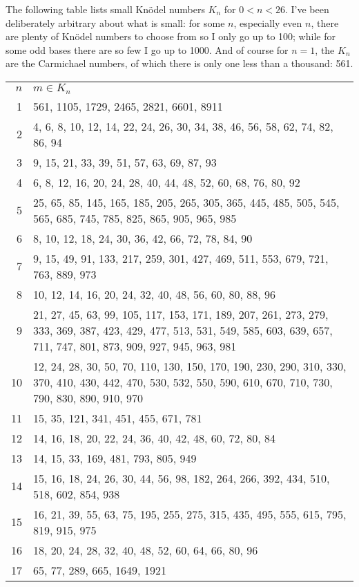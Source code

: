 \documentclass[12pt]{article}
\begin{document}
The following table lists small Kn\"odel numbers $K_n$ for $0 < n < 26$. I've been deliberately arbitrary about what is small: for some $n$, especially even $n$, there are plenty of Kn\"odel numbers to choose from so I only go up to 100; while for some odd bases there are so few I go up to 1000. And of course for $n = 1$, the $K_n$ are the Carmichael numbers, of which there is only one less than a thousand: 561.

\begin{tabular}{|r|l|}
$n$ & $m \in K_n$ \\
1 & 561, 1105, 1729, 2465, 2821, 6601, 8911 \\
2 & 4, 6, 8, 10, 12, 14, 22, 24, 26, 30, 34, 38, 46, 56, 58, 62, 74, 82, 86, 94 \\
3 & 9, 15, 21, 33, 39, 51, 57, 63, 69, 87, 93 \\
4 & 6, 8, 12, 16, 20, 24, 28, 40, 44, 48, 52, 60, 68, 76,    80, 92 \\
5 & 25, 65, 85, 145, 165, 185, 205, 265, 305, 365, 445, 485, 505, 545, 565, 685, 745, 785, 825, 865, 905, 965, 985 \\
6 & 8, 10, 12, 18, 24, 30, 36, 42, 66, 72, 78, 84, 90 \\
7 & 9, 15, 49, 91, 133,  217, 259, 301, 427, 469, 511, 553, 679, 721, 763, 889, 973 \\
8 & 10, 12, 14, 16, 20, 24, 32, 40, 48, 56, 60, 80, 88, 96 \\
9 & 21, 27, 45, 63, 99, 105, 117, 153, 171, 189, 207, 261, 273, 279, 333, 369, 387, 423, 429, 477, 513, 531, 549, 585, 603, 639, 657, 711, 747, 801, 873, 909, 927, 945, 963, 981 \\
10 & 12, 24, 28, 30, 50, 70, 110, 130, 150, 170, 190, 230, 290, 310, 330, 370, 410, 430, 442, 470, 530, 532, 550, 590, 610, 670, 710, 730, 790, 830, 890, 910, 970 \\
11 & 15, 35, 121, 341, 451, 455, 671, 781 \\ 
12 & 14, 16, 18, 20, 22, 24, 36, 40, 42, 48, 60, 72, 80, 84 \\
13 & 14, 15, 33, 169, 481, 793, 805, 949 \\
14 & 15, 16, 18, 24, 26, 30, 44, 56, 98, 182, 264, 266, 392, 434, 510, 518, 602, 854, 938 \\
15 & 16, 21, 39, 55, 63, 75, 195, 255, 275, 315, 435, 495, 555, 615, 795, 819, 915, 975 \\
16 & 18, 20, 24, 28, 32, 40, 48, 52, 60, 64, 66, 80, 96 \\ 
17 & 65, 77, 289, 665, 1649, 1921 \\

\end{tabular}
\end{document}
